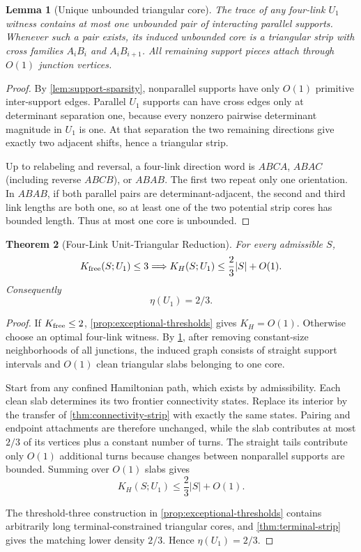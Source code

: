 \documentclass[11pt]{article}
\newtheorem{theorem}{Theorem}[section]
\newtheorem{lemma}[theorem]{Lemma}
\theoremstyle{definition}
\begin{document}
\begin{lemma}[Unique unbounded triangular core]\label{lem:unique-core}
The trace of any four-link $U_1$ witness contains at most one unbounded pair of interacting parallel supports.  Whenever such a pair exists, its induced unbounded core is a triangular strip with cross families $A_iB_i$ and $A_iB_{i+1}$.  All remaining support pieces attach through $O(1)$ junction vertices.
\end{lemma}
\begin{proof}
By \cref{lem:support-sparsity}, nonparallel supports have only $O(1)$ primitive inter-support edges.  Parallel $U_1$ supports can have cross edges only at determinant separation one, because every nonzero pairwise determinant magnitude in $U_1$ is one.  At that separation the two remaining directions give exactly two adjacent shifts, hence a triangular strip.

Up to relabeling and reversal, a four-link direction word is $ABCA$, $ABAC$ (including reverse $ABCB$), or $ABAB$.  The first two repeat only one orientation.  In $ABAB$, if both parallel pairs are determinant-adjacent, the second and third link lengths are both one, so at least one of the two potential strip cores has bounded length.  Thus at most one core is unbounded.
\end{proof}

\begin{theorem}[Four-Link Unit-Triangular Reduction]\label{thm:four-link}
For every admissible $S$,
\[
K_{\rm free}(S;U_1)\le3
\Longrightarrow
K_H(S;U_1)\le\frac23|S|+O(1).
\]
Consequently
\[
\boxed{\eta(U_1)=2/3.}
\]
\end{theorem}
\begin{proof}
If $K_{\rm free}\le2$, \cref{prop:exceptional-thresholds} gives $K_H=O(1)$.  Otherwise choose an optimal four-link witness.  By \cref{lem:unique-core}, after removing constant-size neighborhoods of all junctions, the induced graph consists of straight support intervals and $O(1)$ clean triangular slabs belonging to one core.

Start from any confined Hamiltonian path, which exists by admissibility.  Each clean slab determines its two frontier connectivity states.  Replace its interior by the transfer of \cref{thm:connectivity-strip} with exactly the same states.  Pairing and endpoint attachments are therefore unchanged, while the slab contributes at most $2/3$ of its vertices plus a constant number of turns.  The straight tails contribute only $O(1)$ additional turns because changes between nonparallel supports are bounded.  Summing over $O(1)$ slabs gives
\[
K_H(S;U_1)\le\frac23|S|+O(1).
\]

The threshold-three construction in \cref{prop:exceptional-thresholds} contains arbitrarily long terminal-constrained triangular cores, and \cref{thm:terminal-strip} gives the matching lower density $2/3$.  Hence $\eta(U_1)=2/3$.
\end{proof}
\end{document}
